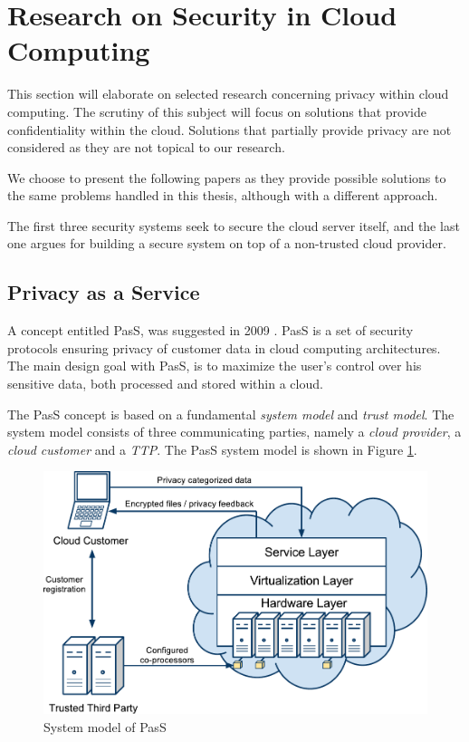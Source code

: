 \documentclass[pdftex,english,10pt,b5paper,twoside]{book}
\begin{document}
\section{Research on Security in Cloud Computing}
\label{sec:research}

This section will elaborate on selected research concerning privacy
within cloud computing. The scrutiny of this subject will focus on 
solutions that provide confidentiality within the cloud. Solutions that partially
provide privacy are not considered as they are not topical to our research.

We choose to present the following papers as they provide possible solutions to the
same problems handled in this thesis, although with a different approach.  


The first three security systems seek to secure the cloud server
itself, and the last one argues for building a secure system on top of
a non-trusted cloud provider.

\subsection{Privacy as a Service}

A concept entitled \ac{PasS}, was suggested in 2009 \cite{PasS}. \ac{PasS} is a
set of security protocols ensuring privacy of customer data in cloud computing
architectures. The main design goal with \ac{PasS}, is to maximize the user's
control over his sensitive data, both processed and stored within a cloud.

The \ac{PasS} concept is based on a fundamental \emph{system model} and
\emph{trust model}. The system model consists of three communicating parties,
namely a \emph{cloud provider}, a \emph{cloud customer} and a \emph{\ac{TTP}}.
The \ac{PasS} system model is shown in Figure \ref{fig:RW:PasS}.

\begin{figure}[h!]
    \centering
    \includegraphics[scale=0.6]{ArchitecturePasS.pdf}
    \caption{System model of PasS}
    \label{fig:RW:PasS}
\end{figure}
\end{document}
